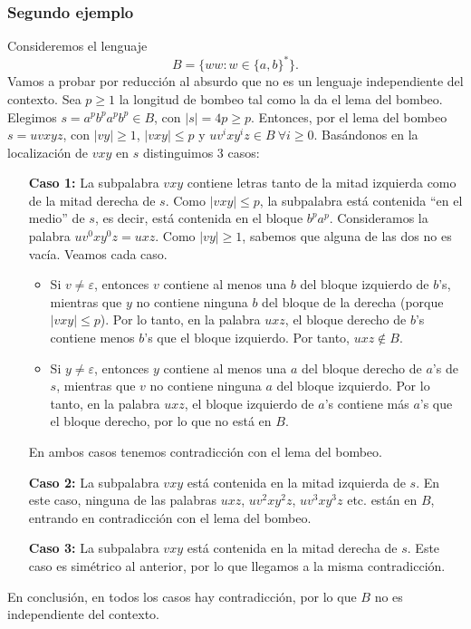 \documentclass[twoside]{article}
\begin{document}
\subsubsection{Segundo ejemplo}
Consideremos el lenguaje %
$$B=\{ww:w\in\{a,b\}^*\}.$$
Vamos a probar por reducción al absurdo que no es un lenguaje independiente del contexto. Sea $p\geq 1$ la longitud de bombeo tal como la da el lema del bombeo. Elegimos $s=a^pb^pa^pb^p\in B$, con $|s|=4p\geq p$. Entonces, por el lema del bombeo $s=uvxyz$, con $|vy|\geq 1$, $|vxy|\leq p$ y $uv^ixy^iz\in B\ \forall i\geq 0$. Basándonos en la localización de $vxy$ en $s$ distinguimos 3 casos:
\begin{itemize}
\item[\textbf{Caso 1:}] La subpalabra $vxy$ contiene letras tanto de la mitad izquierda como de la mitad derecha de $s$. Como $|vxy|\leq p$, la subpalabra está contenida ``en el medio'' de $s$, es decir, está contenida en el bloque $b^pa^p$. Consideramos la palabra $uv^0xy^0z=uxz$. Como $|vy|\geq 1$, sabemos que alguna de las dos no es vacía. Veamos cada caso.
\begin{itemize}
\item Si $v\neq\varepsilon$, entonces $v$ contiene al menos una $b$ del bloque izquierdo de $b$'s, mientras que $y$ no contiene ninguna $b$ del bloque de la derecha (porque $|vxy|\leq p$). Por lo tanto, en la palabra $uxz$, el bloque derecho de $b$'s contiene menos $b$'s que el bloque izquierdo. Por tanto, $uxz\notin B$.
\item Si $y\neq\varepsilon$, entonces $y$ contiene al menos una $a$ del bloque derecho de $a$'s de $s$, mientras que $v$ no contiene ninguna $a$ del bloque izquierdo. Por lo tanto, en la palabra $uxz$, el bloque izquierdo de $a$'s contiene más $a$'s que el bloque derecho, por lo que no está en $B$. 
\end{itemize}
En ambos casos tenemos contradicción con el lema del bombeo.

\item[\textbf{Caso 2:}] La subpalabra $vxy$ está contenida en la mitad izquierda de $s$. En este caso, ninguna de las palabras $uxz$, $uv^2xy^2z$, $uv^3xy^3z$ etc. están en $B$, entrando en contradicción con el lema del bombeo.

\item[\textbf{Caso 3:}] La subpalabra $vxy$ está contenida en la mitad derecha de $s$. Este caso es simétrico al anterior, por lo que llegamos a la misma contradicción. 
\end{itemize}
En conclusión, en todos los casos hay contradicción, por lo que $B$ no es independiente del contexto.
\end{document}
